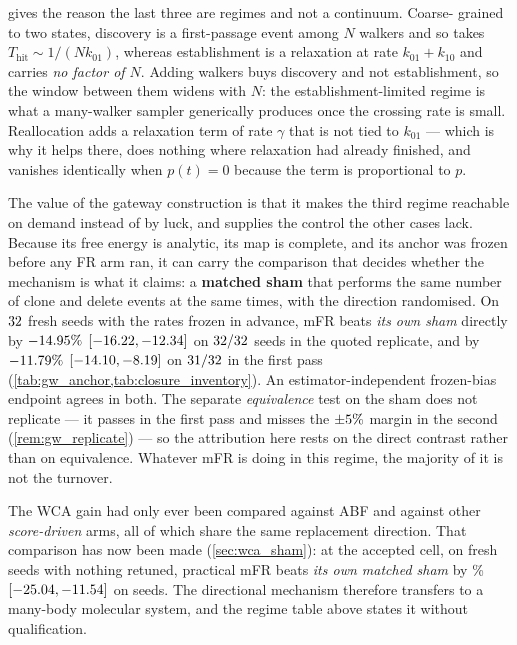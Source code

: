  gives the reason the last three are regimes and not a continuum. Coarse-%
grained to two states, discovery is a first-passage event among $N$ walkers and so takes
$T_{\mathrm{hit}}\sim 1/(N k_{01})$, whereas establishment is a relaxation at rate
$k_{01}+k_{10}$ and carries \emph{no factor of $N$}. Adding walkers buys discovery and not
establishment, so the window between them widens with $N$: the establishment-limited regime is
what a many-walker sampler generically produces once the crossing rate is small. Reallocation
adds a relaxation term of rate $\gamma$ that is not tied to $k_{01}$ --- which is why it helps
there, does nothing where relaxation had already finished, and vanishes identically when
$p(t)=0$ because the term is proportional to $p$.

The value of the gateway construction is that it makes the third regime reachable on demand
instead of by luck, and supplies the control the other cases lack. Because its free energy is
analytic, its map is complete, and its anchor was frozen before any FR arm ran, it can carry
the comparison that decides whether the mechanism is what it claims: a \textbf{matched sham}
that performs the same number of clone and delete events at the same times, with the direction
randomised. On $32$ fresh seeds with the rates frozen in advance, mFR beats
\emph{its own sham} directly by $-14.95\%$ $[-16.22, -12.34]$ on
$32/32$ seeds in the quoted replicate, and by $-11.79\%$
$[-14.10, -8.19]$ on $31/32$ in the first pass
(\cref{tab:gw_anchor,tab:closure_inventory}). An estimator-independent frozen-bias endpoint
agrees in both. The separate \emph{equivalence} test on the sham does not replicate --- it
passes in the first pass and misses the $\pm5\%$ margin in the second
(\cref{rem:gw_replicate}) --- so the attribution here rests on the direct contrast rather than
on equivalence. Whatever mFR is doing in this regime, the majority of it is not the turnover.

\begin{remark}
\label{rem:wca_possibly}
The WCA gain had only ever been compared against ABF and against other \emph{score-driven}
arms, all of which share the same replacement direction. That comparison has now been made
(\cref{sec:wca_sham}): at the accepted cell, on \WcsSeeds{} fresh seeds with nothing retuned,
practical mFR beats \emph{its own matched sham} by \WcvDirect\%
$[-25.04, -11.54]$ on \WcvDirectWins{} seeds. The directional mechanism
therefore transfers to a many-body molecular system, and the regime table above states it
without qualification.
\end{remark}

